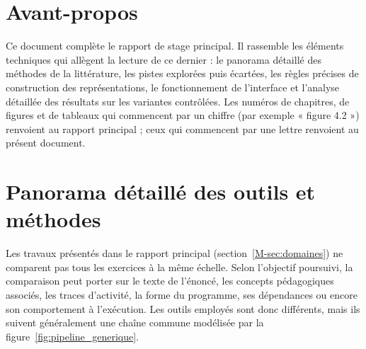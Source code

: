 \documentclass[12pt,a4paper,oneside]{report}
\begin{document}



\chapter*{Avant-propos}
Ce document complète le rapport de stage principal. Il rassemble les
éléments techniques qui allègent la lecture de ce dernier : le panorama
détaillé des méthodes de la littérature, les pistes explorées puis
écartées, les règles précises de construction des représentations, le
fonctionnement de l'interface et l'analyse détaillée des résultats sur les
variantes contrôlées. Les numéros de chapitres, de figures et de tableaux
qui commencent par un chiffre (par exemple « figure 4.2 ») renvoient au
rapport principal ; ceux qui commencent par une lettre renvoient au présent
document.

\chapter{Panorama détaillé des outils et méthodes}
\label{chap:outils}

Les travaux présentés dans le rapport principal (section~\ref{M-sec:domaines}) ne comparent pas tous les exercices à la
même échelle. Selon l'objectif poursuivi, la comparaison peut porter sur le
texte de l'énoncé, les concepts pédagogiques associés, les traces d'activité,
la forme du programme, ses dépendances ou encore son comportement à
l'exécution. Les outils employés sont donc différents, mais ils suivent
généralement une chaîne commune modélisée par la
figure~\ref{fig:pipeline_generique}.
\end{document}
